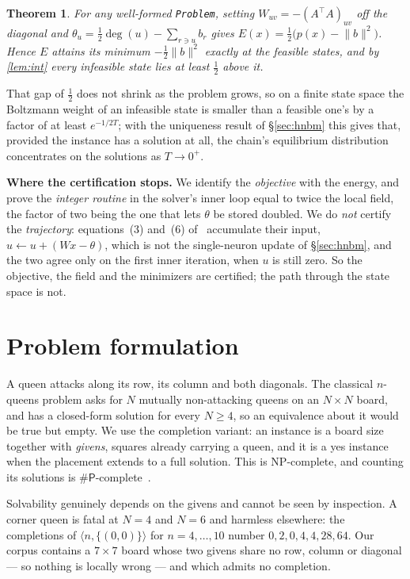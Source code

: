 \documentclass{easychair}
\newtheorem{thm}{Theorem}[section]
\newcommand{\secref}[1]{\hyperref[#1]{\textcolor{academicpurple}{\S\ref*{#1}}}}
\newcommand{\citeref}[1]{\textcolor{academicpurple}{\cite{#1}}}
\begin{document}
\begin{thm}\label{thm:net}
For any well-formed \lstinline{Problem}, setting $W_{uv} = -(A^{\top}\!A)_{uv}$ off the diagonal and
$\theta_u = \tfrac12\deg(u) - \sum_{r\ni u}b_r$ gives $E(x) = \tfrac12\bigl(p(x) - \lVert
b\rVert^2\bigr)$. Hence $E$ attains its minimum $-\tfrac12\lVert b\rVert^2$ exactly at the feasible
states, and by \cref{lem:int} every infeasible state lies at least $\tfrac12$ above it.
\end{thm}

That gap of $\tfrac12$ does not shrink as the problem grows, so on a finite state space the Boltzmann
weight of an infeasible state is smaller than a feasible one's by a factor of at least $e^{-1/2T}$;
with the uniqueness result of \secref{sec:hnbm} this gives that, provided the instance has a solution
at all, the chain's equilibrium distribution concentrates on the solutions as $T \to 0^{+}$.

\medskip\noindent\textbf{Where the certification stops.} We identify the \emph{objective} with the
energy, and prove the \emph{integer routine} in the solver's inner loop equal to twice the local
field, the factor of two being the one that lets $\theta$ be stored doubled. We
do \emph{not} certify the \emph{trajectory}: equations~(3) and~(6) of~\citeref{liwang2022} accumulate
their input, $u \leftarrow u + (Wx-\theta)$, which is not the single-neuron update of
\secref{sec:hnbm}, and the two agree only on the first inner iteration, when $u$ is still zero. So the
objective, the field and the minimizers are certified; the path through the state space is not.

\section{Problem formulation}\label{sec:queens}

A queen attacks along its row, its column and both diagonals. The classical $n$-queens problem asks
for $N$ mutually non-attacking queens on an $N\times N$ board, and has a closed-form solution for
every $N \ge 4$, so an equivalence about it would be true but empty. We use the completion variant: an
instance is a board size together with \emph{givens}, squares already carrying a queen, and it is a
\textsf{yes} instance when the placement extends to a full solution. This is \textsf{NP}-complete, and
counting its solutions is $\#\textsf{P}$-complete~\citeref{gent2017}.

Solvability genuinely depends on the givens and cannot be seen by inspection. A corner queen is fatal
at $N = 4$ and $N = 6$ and harmless elsewhere: the completions of $\langle n,\{(0,0)\}\rangle$ for
$n = 4,\dots,10$ number $0,2,0,4,4,28,64$. Our corpus contains a $7\times7$ board whose two givens
share no row, column or diagonal --- so nothing is locally wrong --- and which admits no completion.
\end{document}
